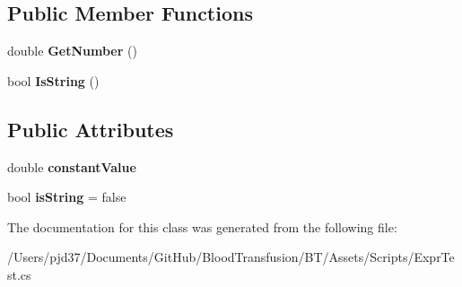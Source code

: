 \subsection*{Public Member Functions}
\begin{DoxyCompactItemize}
\item 
double {\bfseries Get\+Number} ()\hypertarget{class_b83_1_1_logic_expression_parser_1_1_constant_number_a043c02f32ca78c75fa3d483385d5dc86}{}\label{class_b83_1_1_logic_expression_parser_1_1_constant_number_a043c02f32ca78c75fa3d483385d5dc86}

\item 
bool {\bfseries Is\+String} ()\hypertarget{class_b83_1_1_logic_expression_parser_1_1_constant_number_ad4c8f2ce0a36408bbaddae052f9c610a}{}\label{class_b83_1_1_logic_expression_parser_1_1_constant_number_ad4c8f2ce0a36408bbaddae052f9c610a}

\end{DoxyCompactItemize}
\subsection*{Public Attributes}
\begin{DoxyCompactItemize}
\item 
double {\bfseries constant\+Value}\hypertarget{class_b83_1_1_logic_expression_parser_1_1_constant_number_a56bd2dea115625bb179f9cc14d7ab29a}{}\label{class_b83_1_1_logic_expression_parser_1_1_constant_number_a56bd2dea115625bb179f9cc14d7ab29a}

\item 
bool {\bfseries is\+String} = false\hypertarget{class_b83_1_1_logic_expression_parser_1_1_constant_number_acfa7789cf1eb7339338cc6f712009013}{}\label{class_b83_1_1_logic_expression_parser_1_1_constant_number_acfa7789cf1eb7339338cc6f712009013}

\end{DoxyCompactItemize}


The documentation for this class was generated from the following file\+:\begin{DoxyCompactItemize}
\item 
/\+Users/pjd37/\+Documents/\+Git\+Hub/\+Blood\+Transfusion/\+B\+T/\+Assets/\+Scripts/Expr\+Test.\+cs\end{DoxyCompactItemize}
